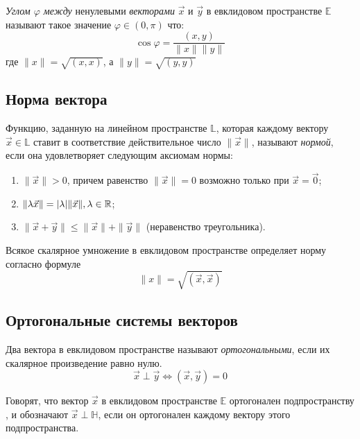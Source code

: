 \begin{definition}
  \textit{Углом $\varphi$ между} ненулевыми \textit{векторами} $\vec{x}$ и $\vec{y}$ в евклидовом пространстве $\mathbb{E}$ называют такое значение  $\varphi \in (0, \pi)$ что: \[
    \cos \varphi = \frac{(x, y)}{\|x\| \|y\|}
  \] 
  где $\|x\| = \sqrt{(x, x)}$, а $\|y\| = \sqrt{(y, y)}$
\end{definition}

\subsection{Норма вектора}

\begin{definition}
  Функцию, заданную на линейном пространстве $\mathbb{L}$, которая каждому вектору $\vec{x} \in \mathbb{L}$ ставит в соответствие действительное число $\|\vec{x}\|$, называют \textit{нормой}, если она удовлетворяет следующим аксиомам нормы:
  \begin{enumerate}
    \item $\|\vec{x}\| > 0$, причем равенство $\|\vec{x}\| = 0$ возможно только при $\vec{x} = \vec{0}$;
    \item $\|\lambda \vec{x}\| = |\lambda| \|\vec{x}\|, \lambda \in \mathbb{R}$;
    \item $\|\vec{x} + \vec{y}\| \le \|\vec{x}\| + \|\vec{y}\|$ (неравенство треугольника).
  \end{enumerate}
\end{definition}

\begin{theorem}
  Всякое скалярное умножение в евклидовом пространстве определяет норму согласно формуле \[
  \|x\| = \sqrt{\left( \vec{x}, \vec{x} \right) } 
  \] 
\end{theorem}

\subsection{Ортогональные системы векторов}

\begin{definition}
  Два вектора в евклидовом пространстве называют \textit{ортогональными}, если их скалярное произведение равно нулю. \[
  \vec{x} \perp \vec{y} \iff (\vec{x}, \vec{y}) = 0
  \] 
\end{definition}

Говорят, что вектор $\vec{x}$ в евклидовом пространстве $\mathbb{E}$ ортогонален подпространству , и обозначают $\vec{x} \perp \mathbb{H}$, если он ортогонален каждому вектору этого подпространства.

